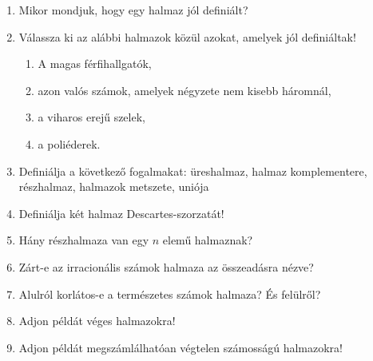 \vfill
\begin{questions}[section.1.5]
  \begin{enumerate}
    \item Mikor mondjuk, hogy egy halmaz jól definiált?

    \item Válassza ki az alábbi halmazok közül azokat, amelyek jól definiáltak!
          \begin{enumerate}
            \item A magas férfihallgatók,
            \item azon valós számok, amelyek négyzete nem kisebb háromnál,
            \item a viharos erejű szelek,
            \item a poliéderek.
          \end{enumerate}

    \item Definiálja a következő fogalmakat: üreshalmaz, halmaz komplementere,
          részhalmaz, halmazok metszete, uniója

    \item Definiálja két halmaz Descartes-szorzatát!

    \item Hány részhalmaza van egy $n$ elemű halmaznak?

    \item Zárt-e az irracionális számok halmaza az összeadásra nézve?

    \item Alulról korlátos-e a természetes számok halmaza? És felülről?

    \item Adjon példát véges halmazokra!

    \item Adjon példát megszámlálhatóan végtelen számosságú halmazokra!
  \end{enumerate}
\end{questions}